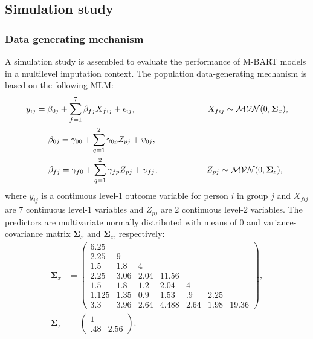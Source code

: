\documentclass[3p,12pt,a4paper]{elsarticle}
\begin{document}
\subsection{Simulation study}
\subsubsection{Data generating mechanism}
A simulation study is assembled to evaluate the performance of M-BART models in a multilevel imputation context. The population data-generating mechanism is based on the following MLM:
\begin{subequations}
\label{eq:population}
\begin{align}
        y_{ij} &= \beta_{0j} + \sum_{f=1}^{7}\beta_{fj}X_{fij} + \epsilon_{ij}, \hspace{3cm} X_{fij} \sim \mathcal{MVN}(0, \boldsymbol{\Sigma}_{x}), \label{eq:population1} \\
        &\hspace{.5cm}\beta_{0j} = \gamma_{00} + \sum_{q=1}^{2}\gamma_{0p}Z_{pj} + \upsilon_{0j}, \label{eq:beta0}\\
        &\hspace{.5cm}\beta_{fj} = \gamma_{f0} + \sum_{q=1}^{2}\gamma_{fp}Z_{pj} + \upsilon_{fj}, \hspace{2cm} Z_{pj} \sim \mathcal{MVN}(0, \boldsymbol{\Sigma}_{z}), \label{eq:betaf}
\end{align}
\end{subequations} where $y_{ij}$ is a continuous level-1 outcome variable for person $i$ in group $j$ and $X_{fij}$ are 7 continuous level-1 variables and $Z_{pj}$ are 2 continuous level-2 variables. The predictors are multivariate normally distributed with means of 0 and variance-covariance matrix $\boldsymbol{\Sigma}_{x}$ and $\boldsymbol{\Sigma}_{z}$, respectively:
\begin{subequations}
\begin{align}
    \boldsymbol{\Sigma}_{x} &= \begin{pmatrix}
        6.25& & & & & & \\
        2.25& 9& & & & & \\
        1.5& 1.8& 4& & & & \\
        2.25& 3.06& 2.04& 11.56& & & \\
        1.5& 1.8& 1.2& 2.04& 4& & \\
        1.125& 1.35& 0.9& 1.53& .9& 2.25& \\
        3.3& 3.96& 2.64& 4.488& 2.64& 1.98& 19.36
    \end{pmatrix}, \label{eq:sigma.x} \\
    \boldsymbol{\Sigma}_{z} &= \begin{pmatrix}
        1& \\
        .48& 2.56
    \end{pmatrix}. \label{eq:sigma.z}
\end{align}
\end{subequations}
\end{document}
